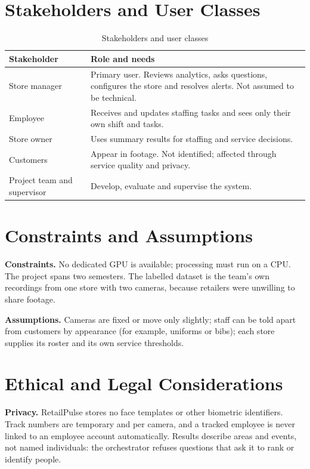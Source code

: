 \section{Stakeholders and User Classes}
\begin{table}[H]
\centering
\caption{Stakeholders and user classes}\label{tab:stakeholders}
\begin{tabular}{P{0.2\textwidth}P{0.72\textwidth}}
\toprule
Stakeholder & Role and needs\\
\midrule
Store manager & Primary user. Reviews analytics, asks questions, configures the store and resolves alerts. Not assumed to be technical.\\
Employee & Receives and updates staffing tasks and sees only their own shift and tasks.\\
Store owner & Uses summary results for staffing and service decisions.\\
Customers & Appear in footage. Not identified; affected through service quality and privacy.\\
Project team and supervisor & Develop, evaluate and supervise the system.\\
\bottomrule
\end{tabular}
\end{table}

\section{Constraints and Assumptions}
\textbf{Constraints.} No dedicated GPU is available; processing must run on a CPU. The project spans two semesters. The labelled dataset is the team's own recordings from one store with two cameras, because retailers were unwilling to share footage.

\textbf{Assumptions.} Cameras are fixed or move only slightly; staff can be told apart from customers by appearance (for example, uniforms or bibs); each store supplies its roster and its own service thresholds.

\section{Ethical and Legal Considerations}
\textbf{Privacy.} RetailPulse stores no face templates or other biometric identifiers. Track numbers are temporary and per camera, and a tracked employee is never linked to an employee account automatically. Results describe areas and events, not named individuals: the orchestrator refuses questions that ask it to rank or identify people.

